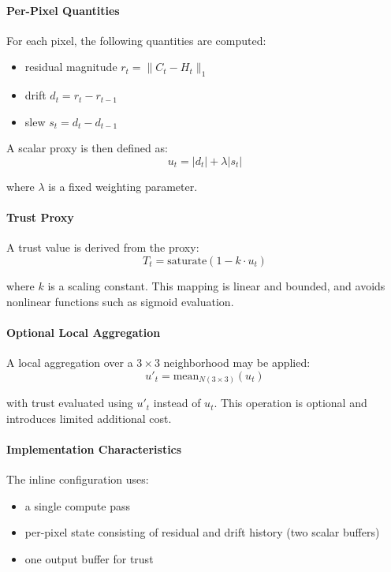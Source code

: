 \documentclass[11pt,letterpaper]{article}
\theoremstyle{gcresult}
\theoremstyle{definition}
\begin{document}
\paragraph{Per-Pixel Quantities}

For each pixel, the following quantities are computed:
\begin{itemize}
    \item residual magnitude $r_t = \lVert C_t - H_t \rVert_1$
    \item drift $d_t = r_t - r_{t-1}$
    \item slew $s_t = d_t - d_{t-1}$
\end{itemize}

A scalar proxy is then defined as:
\[
u_t = |d_t| + \lambda |s_t|
\]

where $\lambda$ is a fixed weighting parameter.

\paragraph{Trust Proxy}

A trust value is derived from the proxy:
\[
T_t = \mathrm{saturate}(1 - k \cdot u_t)
\]

where $k$ is a scaling constant. This mapping is linear and bounded, and avoids nonlinear functions such as sigmoid evaluation.

\paragraph{Optional Local Aggregation}

A local aggregation over a $3\times3$ neighborhood may be applied:
\[
u'_t = \mathrm{mean}_{N(3\times3)}(u_t)
\]

with trust evaluated using $u'_t$ instead of $u_t$. This operation is optional and introduces limited additional cost.

\paragraph{Implementation Characteristics}

The inline configuration uses:
\begin{itemize}
    \item a single compute pass
    \item per-pixel state consisting of residual and drift history (two scalar buffers)
    \item one output buffer for trust
\end{itemize}
\end{document}
